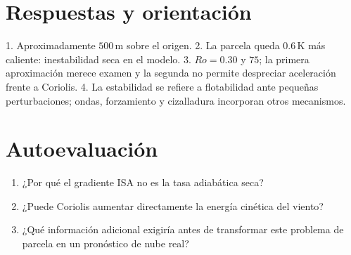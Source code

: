 \section{Respuestas y orientación}
1. Aproximadamente $500\,\mathrm{m}$ sobre el origen. 2. La parcela queda $0.6\,\mathrm{K}$ más caliente: inestabilidad seca en el modelo. 3. $Ro=0.30$ y $75$; la primera aproximación merece examen y la segunda no permite despreciar aceleración frente a Coriolis. 4. La estabilidad se refiere a flotabilidad ante pequeñas perturbaciones; ondas, forzamiento y cizalladura incorporan otros mecanismos.

\section{Autoevaluación}
\begin{enumerate}
\item ¿Por qué el gradiente ISA no es la tasa adiabática seca?
\item ¿Puede Coriolis aumentar directamente la energía cinética del viento?
\item ¿Qué información adicional exigiría antes de transformar este problema de parcela en un pronóstico de nube real?
\end{enumerate}

